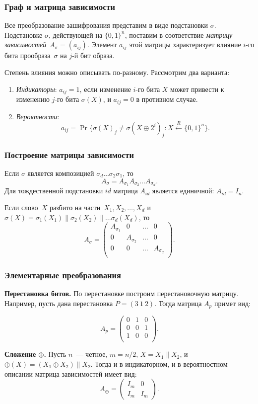 \documentclass{beamer}
\begin{document}
 \begin{frame}
    \frametitle{Граф и матрица зависимости}

Все преобразование зашифрования представим в виде подстановки $\sigma$.
Подстановке $\sigma$, действующей на $\{0,1\}^n$, 
поставим в соответствие {\it матрицу зависимостей}~$A_\sigma=(a_{ij})$.
Элемент $a_{ij}$ этой матрицы характеризует влияние $i$-го
бита прообраза~$\sigma$ на $j$-й бит образа.

Степень влияния можно описывать по-разному.
Рассмотрим два варианта:
\begin{enumerate}
\item
{\it Индикаторы}: $a_{ij}=1$,
если изменение $i$-го бита $X$ может привести 
к изменению $j$-го бита $\sigma(X)$,
и $a_{ij}=0$ в противном случае.

\item
{\it Вероятности}: 
$$
a_{ij}=\Pr\big\{\sigma(X)_j\neq \sigma(X\oplus 2^i)_j\colon
X\stackrel{R}\leftarrow\{0,1\}^n\big\}.
$$
\end{enumerate}
  \end{frame}


 \begin{frame}
    \frametitle{Построение матрицы зависимости}
Если $\sigma$ является композицией $\sigma_d\ldots\sigma_2\sigma_1$,
то
$$
A_\sigma=A_{\sigma_1}A_{\sigma_2}\ldots A_{\sigma_d}.
$$
Для тождественной подстановки $id$ матрица $A_{id}$
является единичной: $A_{id}=I_n$.

Если слово~$X$ разбито на части~$X_1,X_2,\ldots,X_d$ 
и~$\sigma(X)=\sigma_1(X_1)\parallel\sigma_2(X_2)\parallel\ldots\sigma_d(X_d)$,
то
$$
A_\sigma=
\begin{pmatrix}
A_{\sigma_1} & 0 & \ldots & 0\\
0 & A_{\sigma_2} & \ldots & 0\\
0 &   0          & \ldots & A_{\sigma_d}\\
\end{pmatrix}.
$$
  \end{frame}

 \begin{frame}
    \frametitle{Элементарные преобразования}
\textbf{Перестановка битов. } По перестановке построим перестановочную матрицу. Например, пусть дана перестановка $P = (3~1~2)$. Тогда матрица $A_p$ примет вид:

$$
A_p = 
\begin{pmatrix} 
0 & 1 & 0\\ 
0 & 0 & 1\\ 
1 & 0 & 0\\
\end{pmatrix}.
$$

\textbf{Сложение $\oplus$.} Пусть $n$~--- четное, $m=n/2$,
$X=X_1\parallel X_2$, 
и $\oplus(X)=(X_1\oplus X_2)\parallel X_2$.
Тогда и в индикаторном, и в вероятностном описании 
матрица зависимостей имеет вид:
$$
A_\oplus = 
\begin{pmatrix} 
I_m & 0\\ 
I_m & I_m 
\end{pmatrix}.
$$
  \end{frame}
\end{document}
